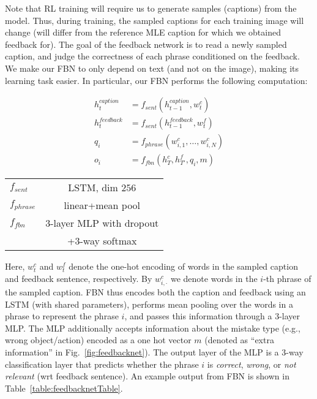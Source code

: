 Note that RL training will require us to generate samples (captions) from the model. Thus, during training, the sampled captions for each training image will change (will differ from the reference MLE caption for which we obtained feedback for). 
The goal of the feedback network is to read a newly sampled caption, and judge the correctness of each phrase conditioned on the feedback. We make our FBN to only depend on text (and not on the image), making its learning task easier. In particular, our FBN performs the following computation:\\
\begin{minipage}{0.52\linewidth}
\vspace{-1mm}
\begin{align}
\label{eq:feedbacknet}
h^{caption}_t &= f_{sent}(h^{caption}_{t-1},w^c_t)\\
h^{feedback}_t &= f_{sent}(h^{feedback}_{t-1},w^f_t)\\
q_i&=f_{phrase}(w^c_{i,1},\dots,w^c_{i,N})\\
o_i&=f_{fbn}(h^c_T,h^f_{T'},q_i,m)
\end{align}
\end{minipage}
\hspace{8mm}
\begin{minipage}{0.4\linewidth}
\vspace{4mm}
{\tabulinesep=0.8mm
\begin{tabu}{|l|c|}
\hline
$f_{sent}$ & LSTM, dim $256$\\
$f_{phrase}$ & linear+mean pool\\
$f_{fbn}$ & 3-layer MLP with dropout\\
& +3-way softmax\\
\hline
\end{tabu}
}
\vspace{2mm}
\end{minipage}
Here, $w^c_t$ and $w^f_t$ denote the one-hot encoding of words in the sampled caption and feedback sentence, respectively. By $w^c_{i,\cdot}$ we denote words in the $i$-th phrase of the sampled caption. FBN thus encodes both the caption and feedback using an LSTM (with shared parameters), performs mean pooling over the words in a phrase to represent the phrase $i$, and passes this information through a 3-layer MLP. The MLP additionally accepts information about the mistake type (e.g., wrong object/action) encoded as a one hot vector $m$ (denoted as ``extra information'' in Fig.~\ref{fig:feedbacknet}). The output layer of the MLP is a 3-way classification layer that predicts whether the phrase $i$ is \emph{correct}, \emph{wrong}, or \emph{not relevant} (wrt feedback sentence). An example output from FBN is shown in Table~\ref{table:feedbacknetTable}.

